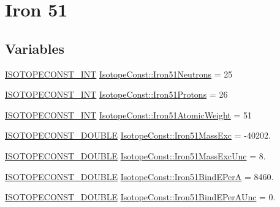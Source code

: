\hypertarget{group___isotope_const-_iron-_fe51}{}\section{Iron 51}
\label{group___isotope_const-_iron-_fe51}
\subsection*{Variables}
\begin{DoxyCompactItemize}
\item 
\mbox{\hyperlink{group___isotope_const-_macros_ga5f18360b3e99483a35c32d789e62621c}{I\+S\+O\+T\+O\+P\+E\+C\+O\+N\+S\+T\+\_\+\+I\+NT}} \mbox{\hyperlink{group___isotope_const-_iron-_fe51_ga0d34a4e4b2c6b727b670d92f0b6b5a10}{Isotope\+Const\+::\+Iron51\+Neutrons}} = 25
\item 
\mbox{\hyperlink{group___isotope_const-_macros_ga5f18360b3e99483a35c32d789e62621c}{I\+S\+O\+T\+O\+P\+E\+C\+O\+N\+S\+T\+\_\+\+I\+NT}} \mbox{\hyperlink{group___isotope_const-_iron-_fe51_ga9130142223f6c0be6ca5f63eb5588fee}{Isotope\+Const\+::\+Iron51\+Protons}} = 26
\item 
\mbox{\hyperlink{group___isotope_const-_macros_ga5f18360b3e99483a35c32d789e62621c}{I\+S\+O\+T\+O\+P\+E\+C\+O\+N\+S\+T\+\_\+\+I\+NT}} \mbox{\hyperlink{group___isotope_const-_iron-_fe51_ga57603933424ac7afcfd9695bea621d9a}{Isotope\+Const\+::\+Iron51\+Atomic\+Weight}} = 51
\item 
\mbox{\hyperlink{group___isotope_const-_macros_ga8f45a7272ce02c0b4c65c44636ed719a}{I\+S\+O\+T\+O\+P\+E\+C\+O\+N\+S\+T\+\_\+\+D\+O\+U\+B\+LE}} \mbox{\hyperlink{group___isotope_const-_iron-_fe51_ga472a1dbab2616edfaffcc8e60bfc6000}{Isotope\+Const\+::\+Iron51\+Mass\+Exc}} = -\/40202.
\item 
\mbox{\hyperlink{group___isotope_const-_macros_ga8f45a7272ce02c0b4c65c44636ed719a}{I\+S\+O\+T\+O\+P\+E\+C\+O\+N\+S\+T\+\_\+\+D\+O\+U\+B\+LE}} \mbox{\hyperlink{group___isotope_const-_iron-_fe51_gabd668c74a2d609aeb34cffaeb7dbc3f2}{Isotope\+Const\+::\+Iron51\+Mass\+Exc\+Unc}} = 8.
\item 
\mbox{\hyperlink{group___isotope_const-_macros_ga8f45a7272ce02c0b4c65c44636ed719a}{I\+S\+O\+T\+O\+P\+E\+C\+O\+N\+S\+T\+\_\+\+D\+O\+U\+B\+LE}} \mbox{\hyperlink{group___isotope_const-_iron-_fe51_gae1bcda9ffb364f5f242c45fe695ba930}{Isotope\+Const\+::\+Iron51\+Bind\+E\+PerA}} = 8460.
\item 
\mbox{\hyperlink{group___isotope_const-_macros_ga8f45a7272ce02c0b4c65c44636ed719a}{I\+S\+O\+T\+O\+P\+E\+C\+O\+N\+S\+T\+\_\+\+D\+O\+U\+B\+LE}} \mbox{\hyperlink{group___isotope_const-_iron-_fe51_ga92e9f42d5102b209d778c50949175f06}{Isotope\+Const\+::\+Iron51\+Bind\+E\+Per\+A\+Unc}} = 0.

\end{DoxyCompactItemize}
